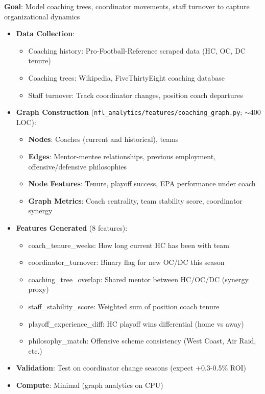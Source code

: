 \textbf{Goal}: Model coaching trees, coordinator movements, staff turnover to capture organizational dynamics

\begin{itemize}
  \item {} \textbf{Data Collection}:
  \begin{itemize}
    \item Coaching history: Pro-Football-Reference scraped data (HC, OC, DC tenure)
    \item Coaching trees: Wikipedia, FiveThirtyEight coaching database
    \item Staff turnover: Track coordinator changes, position coach departures
  \end{itemize}
  \item {} \textbf{Graph Construction} (\texttt{nfl\_analytics/features/coaching\_graph.py}; $\sim$400 LOC):
  \begin{itemize}
    \item \textbf{Nodes}: Coaches (current and historical), teams
    \item \textbf{Edges}: Mentor-mentee relationships, previous employment, offensive/defensive philosophies
    \item \textbf{Node Features}: Tenure, playoff success, EPA performance under coach
    \item \textbf{Graph Metrics}: Coach centrality, team stability score, coordinator synergy
  \end{itemize}
  \item {} \textbf{Features Generated} (8 features):
  \begin{itemize}
    \item coach\_tenure\_weeks: How long current HC has been with team
    \item coordinator\_turnover: Binary flag for new OC/DC this season
    \item coaching\_tree\_overlap: Shared mentor between HC/OC/DC (synergy proxy)
    \item staff\_stability\_score: Weighted sum of position coach tenure
    \item playoff\_experience\_diff: HC playoff wins differential (home vs away)
    \item philosophy\_match: Offensive scheme consistency (West Coast, Air Raid, etc.)
  \end{itemize}
  \item {} \textbf{Validation}: Test on coordinator change seasons (expect +0.3-0.5\% ROI)
  \item \textbf{Compute}: Minimal (graph analytics on CPU)
\end{itemize}

